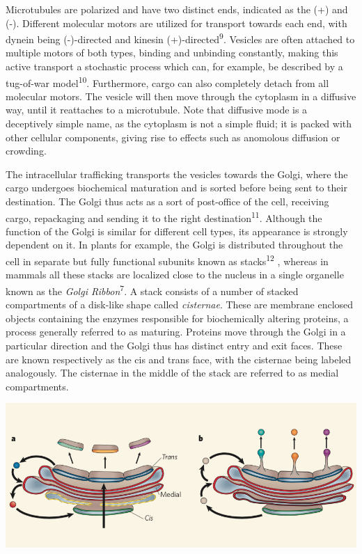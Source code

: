 \documentclass{Dissertate}
\let\origfigure\figure
\let\endorigfigure\endfigure
\renewenvironment{figure}[1][2] {
    \expandafter\origfigure\expandafter[H]
} {
    \endorigfigure
}
\begin{document}
Microtubules are polarized and have two distinct ends, indicated as the
(+) and (-). Different molecular motors are utilized for transport
towards each end, with dynein being (-)-directed and kinesin
(+)-directed\textsuperscript{9}. Vesicles are often attached to multiple
motors of both types, binding and unbinding constantly, making this
active transport a stochastic process which can, for example, be
described by a tug-of-war model\textsuperscript{10}. Furthermore, cargo
can also completely detach from all molecular motors. The vesicle will
then move through the cytoplasm in a diffusive way, until it reattaches
to a microtubule. Note that diffusive mode is a deceptively simple name,
as the cytoplasm is not a simple fluid; it is packed with other cellular
components, giving rise to effects such as anomolous diffusion or
crowding.

The intracellular trafficking transports the vesicles towards the Golgi,
where the cargo undergoes biochemical maturation and is sorted before
being sent to their destination. The Golgi thus acts as a sort of
post-office of the cell, receiving cargo, repackaging and sending it to
the right destination\textsuperscript{11}. Although the function of the
Golgi is similar for different cell types, its appearance is strongly
dependent on it. In plants for example, the Golgi is distributed
throughout the cell in separate but fully functional subunits known as
stacks\textsuperscript{12} , whereas in mammals all these stacks are
localized close to the nucleus in a single organelle known as the
\emph{Golgi Ribbon}\textsuperscript{7}. A stack consists of a number of
stacked compartments of a disk-like shape called \emph{cisternae}. These
are membrane enclosed objects containing the enzymes responsible for
biochemically altering proteins, a process generally referred to as
maturing. Proteins move through the Golgi in a particular direction and
the Golgi thus has distinct entry and exit faces. These are known
respectively as the cis and trans face, with the cisternae being labeled
analogously. The cisternae in the middle of the stack are referred to as
medial compartments.

\begin{figure}
\hypertarget{fig:golgimodels}{%
\centering
\includegraphics{source/figures/png/golgimodels.png}
\caption{\textbf{Left panel}: In the cisternal maturation model,
compartments mature as a whole and thus change identity. \textbf{Right
panel}: In the vesicle transport model, compartments are static objects
and cargo is being transported from compartment to compartment by
vesicles. Image taken from 13.}\label{fig:golgimodels}
}
\end{figure}
\end{document}
